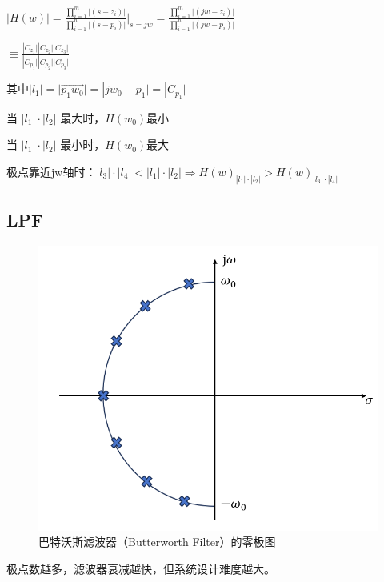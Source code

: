\documentclass[UTF8]{ctexart}
\begin{document}
$| H(w)\vert =\frac{\prod _{i=1}^m| (s-z_i)\vert}{\prod _{i=1}^n| (s-p_i)\vert }\vert _{s=jw}=\frac{\prod _{i=1}^m| (jw-z_i)\vert}{\prod _{i=1}^n| (jw-p_i)\vert }$\par
$\equiv \frac{|C_{z_1} \vert|C_{z_2} \vert|C_{z_3} \vert }{|C_{p_1} \vert|C_{p_2} \vert|C_{p_3} \vert} $\par
其中$|l_1 \vert=| \overrightarrow{p_1w_0}\vert  =|jw_0-p_1 \vert =|C_{p_1} \vert $\par
当 $| l_1\vert \cdot | l_2\vert $ 最大时，$H(w_0)$最小\par
当 $| l_1\vert \cdot | l_2\vert $ 最小时，$H(w_0)$最大\par
极点靠近jw轴时：$| l_3\vert \cdot | l_4\vert< | l_1\vert \cdot | l_2\vert\Longrightarrow H(w)_{| l_1\vert \cdot | l_2\vert}>H(w)_{| l_3\vert \cdot | l_4\vert}$\par
\subsection{LPF}
\begin{figure}[h]
    \centering         %
    \includegraphics[scale=0.25]{3.png}
    \caption{巴特沃斯滤波器（Butterworth Filter）的零极图}
\end{figure}
极点数越多，滤波器衰减越快，但系统设计难度越大。\par
\end{document}
